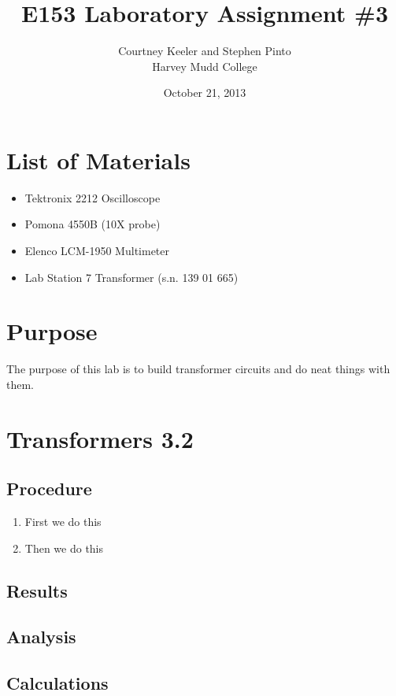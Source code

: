 \documentclass[12pt,letterpaper]{report}
\begin{document}
\title{E153 Laboratory Assignment \#3}
\author{Courtney Keeler and Stephen Pinto\\
Harvey Mudd College}
\date{October 21, 2013}
\maketitle

\section*{List of Materials}
\begin{itemize}
	\item Tektronix 2212 Oscilloscope
	\item Pomona 4550B (10X probe)
	\item Elenco LCM-1950 Multimeter
	\item Lab Station 7 Transformer (s.n. 139 01 665)
\end{itemize}

\section*{Purpose}
The purpose of this lab is to build transformer circuits and do neat things with them.

\section*{Transformers 3.2}
\subsection*{Procedure}

\begin{enumerate}
\item First we do this
\item Then we do this
\end{enumerate}

\subsection*{Results}

\subsection*{Analysis}

\subsection*{Calculations}
\end{document}
